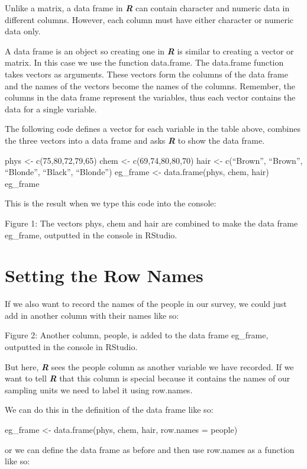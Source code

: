 \documentclass[
]{book}
\begin{document}
Unlike a matrix, a data frame in \textbf{\emph{R}} can contain character and numeric data in different columns. However, each column must have either character or numeric data only.

A data frame is an object so creating one in \textbf{\emph{R}} is similar to creating a vector or matrix. In this case we use the function data.frame. The data.frame function takes vectors as arguments. These vectors form the columns of the data frame and the names of the vectors become the names of the columns. Remember, the columns in the data frame represent the variables, thus each vector contains the data for a single variable.

The following code defines a vector for each variable in the table above, combines the three vectors into a data frame and asks \textbf{\emph{R}} to show the data frame.

phys \textless- c(75,80,72,79,65)
chem \textless- c(69,74,80,80,70)
hair \textless- c(``Brown'', ``Brown'', ``Blonde'', ``Black'', ``Blonde'')
eg\_frame \textless- data.frame(phys, chem, hair)
eg\_frame

This is the result when we type this code into the console:

Figure 1: The vectors phys, chem and hair are combined to make the data frame eg\_frame, outputted in the console in RStudio.

\section{Setting the Row Names}\label{setting-the-row-names}

If we also want to record the names of the people in our survey, we could just add in another column with their names like so:

Figure 2: Another column, people, is added to the data frame eg\_frame, outputted in the console in RStudio.

But here, \textbf{\emph{R}} sees the people column as another variable we have recorded. If we want to tell \textbf{\emph{R}} that this column is special because it contains the names of our sampling units we need to label it using row.names.

We can do this in the definition of the data frame like so:

eg\_frame \textless- data.frame(phys, chem, hair, row.names = people)

or we can define the data frame as before and then use row.names as a function like so:
\end{document}
